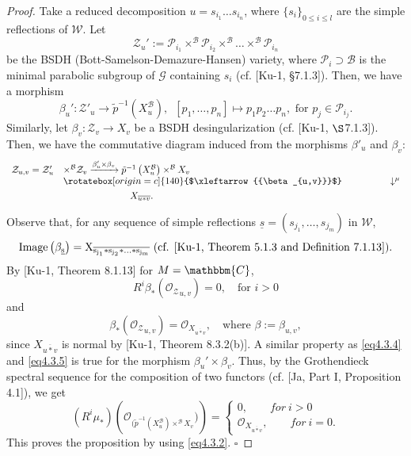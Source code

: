 \documentclass{article}
\def\G{\mathcal{G}}
\def\P{\mathcal{P}}
\def\B{\mathcal{B}}
\def\W{\mathcal{W}}
\def\cite#1{#1}
\def\Image{\rm{Image}}
\begin{document}
\begin{proof}
Take a reduced decomposition
$u=s_{i_1}\ldots s_{i_n}$, where $\{s_i\}_{0\leq i\leq l}$ are the simple reflections of $\W$. 
Let
$$\mathcal{Z}_u' := \P_{i_1}\times^\B \P_{i_2}\times ^\B \ldots \times ^\B \P_{i_n}$$
 be the BSDH (Bott-Samelson-Demazure-Hansen) variety, where $\P_i\supset \B$ is the minimal parabolic subgroup of $\G$ containing $s_i$ (cf. [\cite{Ku-1}, \S 7.1.3]). Then, we have a morphism
$$
\beta_u':\mathcal{Z}'_u\rightarrow \tilde{p}^{-1}\left(X_u^\B\right),\,\,\,[p_1,\ldots ,p_n] \mapsto p_1p_2 \ldots p_n, \mbox { for } p_j\in \P_{i_j}. 
 $$
 Similarly, let $\beta_v:\mathcal{Z}_{v}\rightarrow X_v$ be a BSDH desingularization (cf. [Ku-1, $\S$7.1.3]). Then, we have the commutative diagram induced from the morphisms $\beta'_u$ and $\beta_v$: 
$$
\begin{array}{ll}
\mathcal{Z}_{u,v}= \mathcal{Z}'_u & \times^\B \mathcal{Z}_v \xrightarrow{\beta_u' \times \beta_v} \tilde{p}^{-1}\left(X^\B_u\right) \times^\B X_v\\
&\rotatebox[origin=c]{140}{$\xleftarrow{{\beta_{u,v}}}$} 
\phantom{X^\B  \underrightarrow{\beta_u' \times \beta_v} }\downarrow^\mu\\
&\phantom{= X^\B \mathcal{Z}_v \underrightarrow{\beta_u' \times \beta_v} } X_{\overline{u*v}} .
\end{array}
$$
Observe that, for any sequence of simple reflections  $\underline{s} = (s_{j_1},\ldots,s_{j_m})$ in $\W$, 
\begin{equation}\label{eq4.3.3}
\Image \left(\beta_{\underline{s}}\right)= X_{\overline{s_{j_1}*s_{j_2}* \ldots * s_{j_m}}}\mbox{ (cf. [\cite{Ku-1}, Theorem 5.1.3 and Definition 7.1.13])}.
\end{equation}
By [\cite{Ku-1}, Theorem 8.1.13] for $M=\mathbbm{C}$,
\begin{equation}\label{eq4.3.4}
R^i \beta_* \left({\mathcal{O}_{\mathcal{Z}}}_{u,v}\right)=0, \quad\mbox{for } i>0 
\end{equation}
and 
\begin{equation}\label{eq4.3.5}
\beta_* \left({\mathcal{O}_{\mathcal{Z}}}_{u,v}\right)= \mathcal{O}_{X_{\overline{u*v}}},\quad \mbox{where } \beta:= \beta_{u,v},
\end{equation}
since $X_{\overline{u*v}}$ is normal by [\cite{Ku-1}, Theorem 8.3.2(b)]. A similar property as \eqref{eq4.3.4}  and \eqref{eq4.3.5} is true for the morphism $\beta_u'\times \beta_v$. Thus, by the Grothendieck spectral sequence for the composition of two functors (cf. [\cite{Ja}, Part I, Proposition 4.1]), we get 
$$
\left(R^i \mu_*\right)\left(\mathcal{O}_{(\tilde{p}^{-1}(X_u^\B)\times^\B X_v})\right) =
\left\{ \begin{array}{l}
0, \qquad for ~i>0\\
\mathcal{O}_{X_{\overline{u*v}}}, \qquad for ~i=0.
\end{array}\right.
$$
This proves the proposition by using \eqref{eq4.3.2}. $\square$
\end{proof}
\end{document}
